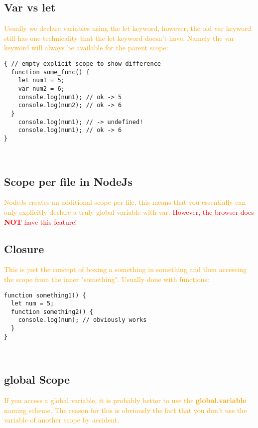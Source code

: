 \documentclass[main.tex,fontsize=6pt,paper=a4,paper=landscape,DIV=calc,]{scrartcl}
\begin{document}
\begin{multicols*}{4}
\subsection{Var vs let}  
\textcolor{orange}{Usually we declare variables using the let keyword, however, the old var keyword still has one technicality that the let keyword doesn't have. Namely the var keyword will always be available for the parent scope:}\newline
\begin{lstlisting}
{ // empty explicit scope to show difference
  function some_func() {
    let num1 = 5;
    var num2 = 6;
    console.log(num1); // ok -> 5
    console.log(num2); // ok -> 6
  }
    console.log(num1); // -> undefined!
    console.log(num1); // ok -> 6
}
\end{lstlisting}
\, \newline

\subsection{Scope per file in NodeJs} 
\textcolor{orange}{NodeJs creates an additional scope per file, this means that you essentially can only explicitly declare a truly global variable with var.}\newline
\textcolor{red}{However, the browser does \textbf{NOT} have this feature!}

\subsection{Closure}  
\textcolor{orange}{This is just the concept of boxing a something in something and then accessing the scope from the inner "something". Usually done with functions:}\newline
\begin{lstlisting}
function something1() {
  let num = 5;
  function something2() {
    console.log(num); // obviously works
  }
}
\end{lstlisting}
\, \newline

\subsection{global Scope}  
\textcolor{orange}{If you access a global variable, it is probably better to use the \textbf{global.variable} naming scheme. The reason for this is obviously the fact that you don't use the variable of another scope by accident.}


\end{multicols*}
\end{document}
